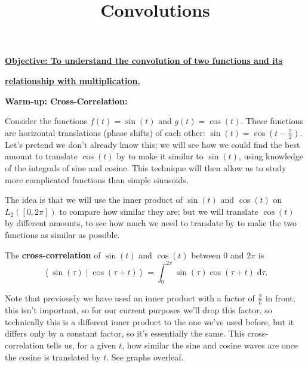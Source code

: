 \documentclass{article}
\newcommand{\diff}{\;\mathrm{d}}
\newcommand{\braket}[2]{\left\langle #1 \mid #2 \right\rangle}
\begin{document}
\title{Convolutions}
\date{}

\maketitle
\thispagestyle{empty}

\Large

\vskip -10mm

\textbf{\underline{Objective: To understand the convolution of two functions and its}}

\textbf{\underline{relationship with multiplication.}}






\vspace{5mm}












\textbf{Warm-up: Cross-Correlation:}

\bigskip


Consider the functions $f(t)=\sin(t)$ and $g(t)=\cos(t)$. These functions are horizontal translations (phase shifts) of each other: $\sin(t)=\cos\left(t-\frac{\pi}{2}\right)$. Let's pretend we don't already know this; we will see how we could find the best amount to translate $\cos(t)$ by to make it similar to $\sin(t)$, using knowledge of the integrals of sine and cosine. This technique will then allow us to study more complicated functions than simple sinusoids.\medskip

The idea is that we will use the inner product of $\sin(t)$ and $\cos(t)$ on $L_2([0,2\pi])$ to compare how similar they are; but we will translate $\cos(t)$ by different amounts, to see how much we need to translate by to make the two functions as similar as possible.

The \textbf{cross-correlation} of $\sin(t)$ and $\cos(t)$ between $0$ and $2\pi$ is
\[\braket{\sin(\tau)}{\cos(\tau+t)}=\int_{0}^{2\pi}\sin(\tau)\cos(\tau+t)\diff \tau.\]

Note that previously we have used an inner product with a factor of $\frac{2}{L}$ in front; this isn't important, so for our current purposes we'll drop this factor, so technically this is a different inner product to the one we've used before, but it differs only by a constant factor, so it's essentially the same. This cross-correlation tells us, for a given $t$, how similar the sine and cosine waves are once the cosine is translated by $t$. See graphs overleaf.\bigskip
\end{document}
